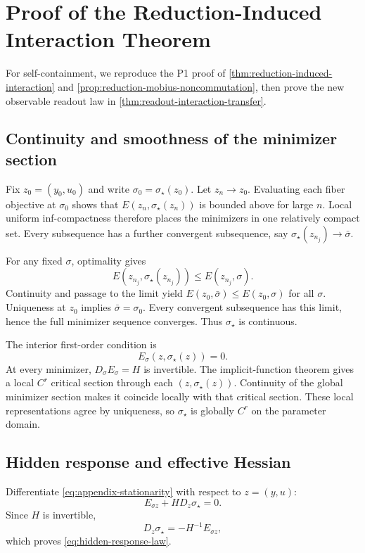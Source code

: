 \section{Proof of the Reduction-Induced Interaction Theorem}
\label{app:interaction-proof}

For self-containment, we reproduce the P1 proof of
\cref{thm:reduction-induced-interaction} and
\cref{prop:reduction-mobius-noncommutation}, then prove the new observable
readout law in \cref{thm:readout-interaction-transfer}.

\subsection{Continuity and smoothness of the minimizer section}

Fix $z_0=(y_0,u_0)$ and write $\sigma_0=\sigma_\star(z_0)$.  Let $z_n\to z_0$.  Evaluating each fiber objective at $\sigma_0$ shows that $E(z_n,\sigma_\star(z_n))$ is bounded above for large $n$.  Local uniform inf-compactness therefore places the minimizers in one relatively compact set.  Every subsequence has a further convergent subsequence, say $\sigma_\star(z_{n_j})\to\bar\sigma$.

For any fixed $\sigma$, optimality gives
\[
E(z_{n_j},\sigma_\star(z_{n_j}))\le E(z_{n_j},\sigma).
\]
Continuity and passage to the limit yield $E(z_0,\bar\sigma)\le E(z_0,\sigma)$ for all $\sigma$.  Uniqueness at $z_0$ implies $\bar\sigma=\sigma_0$.  Every convergent subsequence has this limit, hence the full minimizer sequence converges.  Thus $\sigma_\star$ is continuous.

The interior first-order condition is
\begin{equation}
E_\sigma(z,\sigma_\star(z))=0.
\label{eq:appendix-stationarity}
\end{equation}
At every minimizer, $D_\sigma E_\sigma=H$ is invertible.  The implicit-function theorem gives a local $C^r$ critical section through each $(z,\sigma_\star(z))$.  Continuity of the global minimizer section makes it coincide locally with that critical section.  These local representations agree by uniqueness, so $\sigma_\star$ is globally $C^r$ on the parameter domain.

\subsection{Hidden response and effective Hessian}

Differentiate \cref{eq:appendix-stationarity} with respect to $z=(y,u)$:
\[
E_{\sigma z}+H D_z\sigma_\star=0.
\]
Since $H$ is invertible,
\[
D_z\sigma_\star=-H^{-1}E_{\sigma z},
\]
which proves \cref{eq:hidden-response-law}.

